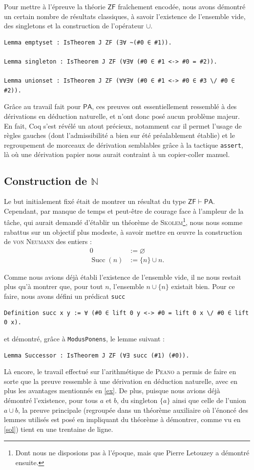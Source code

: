 \documentclass[a4paper]{article}
\newcommand{\N}{\ensuremath{\mathbb{N}}}
\DeclareMathOperator{\Succ}{\mathrm{Succ}}
\newcommand{\PA}{\mathsf{PA}}
\newcommand{\ZF}{\mathsf{ZF}}
\theoremstyle{remark}
\theoremstyle{remark}
\theoremstyle{remark}
\theoremstyle{definition}
\theoremstyle{definition}
\theoremstyle{definition}
\begin{document}
Pour mettre à l'épreuve la théorie $\ZF$ fraîchement encodée, nous avons démontré un certain nombre de résultats classiques, à savoir l'existence de l'ensemble vide, des singletons et la construction de l'opérateur $\cup$.
\begin{verbatim}
Lemma emptyset : IsTheorem J ZF (∃∀ ~(#0 ∈ #1)).

Lemma singleton : IsTheorem J ZF (∀∃∀ (#0 ∈ #1 <-> #0 = #2)).

Lemma unionset : IsTheorem J ZF (∀∀∃∀ (#0 ∈ #1 <-> #0 ∈ #3 \/ #0 ∈ #2)).
\end{verbatim}

Grâce au travail fait pour $\PA$, ces preuves ont essentiellement ressemblé à des dérivations en déduction naturelle, et n'ont donc posé aucun problème majeur. En fait, Coq s'est révélé un atout précieux, notamment car il permet l'usage de règles gauches (dont l'admissibilité a bien sur été préalablement établie) et le regroupement de morceaux de dérivation semblables grâce à la tactique \verb+assert+, là où une dérivation papier nous aurait contraint à un copier-coller manuel.

\subsection{Construction de $\N$}

Le but initialement fixé était de montrer un résultat du type $\ZF \vdash \PA$. Cependant, par manque de temps et peut-être de courage face à l'ampleur de la tâche, qui aurait demandé d'établir un théorème de \textsc{Skolem}\footnote{Dont nous ne disposions pas à l'époque, mais que Pierre Letouzey a démontré ensuite.}, nous nous somme rabattus sur un objectif plus modeste, à savoir mettre en \oe uvre la construction de \textsc{von Neumann} des entiers :
\begin{align*}
0 &:= \varnothing \\
\Succ (n) &:= \{ n \} \cup n.
\end{align*}

Comme nous avions déjà établi l'existence de l'ensemble vide, il ne nous restait plus qu'à montrer que, pour tout $n$, l'ensemble $n \cup \{ n \}$ existait bien. Pour ce faire, nous avons défini un prédicat \verb+succ+
\begin{verbatim}
Definition succ x y := ∀ (#0 ∈ lift 0 y <-> #0 = lift 0 x \/ #0 ∈ lift 0 x).
\end{verbatim}
et démontré, grâce à \verb+ModusPonens+, le lemme suivant :
\begin{verbatim}
Lemma Successor : IsTheorem J ZF (∀∃ succ (#1) (#0)).
\end{verbatim}
Là encore, le travail effectué sur l'arithmétique de \textsc{Peano} a permis de faire en sorte que la preuve ressemble à une dérivation en déduction naturelle, avec en plus les avantages mentionnés en \ref{ex}. De plus, puisque nous avions déjà démontré l'existence, pour tous $a$ et $b$, du singleton $\{ a \}$ ainsi que celle de l'union $a \cup b$, la preuve principale (regroupée dans un théorème auxiliaire où l'énoncé des lemmes utilisés est posé en impliquant du théorème à démontrer, comme vu en \ref{sol}) tient en une trentaine de ligne.
\end{document}
